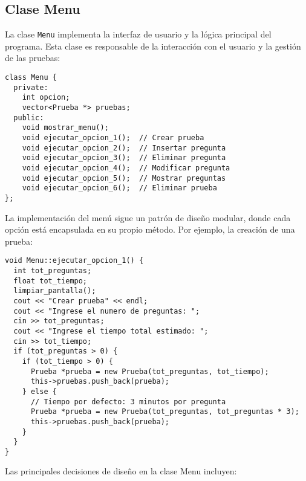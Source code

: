 \documentclass[12pt]{article}
\begin{document}
\subsection{Clase Menu}
La clase \texttt{Menu} implementa la interfaz de usuario y la l\'ogica principal del programa. Esta clase es responsable de la interacci\'on con el usuario y la gesti\'on de las pruebas:

\begin{lstlisting}[style=customc]
class Menu {
  private:
    int opcion;
    vector<Prueba *> pruebas;
  public:
    void mostrar_menu();
    void ejecutar_opcion_1();  // Crear prueba
    void ejecutar_opcion_2();  // Insertar pregunta
    void ejecutar_opcion_3();  // Eliminar pregunta
    void ejecutar_opcion_4();  // Modificar pregunta
    void ejecutar_opcion_5();  // Mostrar preguntas
    void ejecutar_opcion_6();  // Eliminar prueba
};
\end{lstlisting}

La implementaci\'on del men\'u sigue un patr\'on de dise\~no modular, donde cada opci\'on est\'a encapsulada en su propio m\'etodo. Por ejemplo, la creaci\'on de una prueba:

\begin{lstlisting}[style=customc]
void Menu::ejecutar_opcion_1() {  
  int tot_preguntas;
  float tot_tiempo;
  limpiar_pantalla();
  cout << "Crear prueba" << endl;
  cout << "Ingrese el numero de preguntas: ";
  cin >> tot_preguntas;
  cout << "Ingrese el tiempo total estimado: ";
  cin >> tot_tiempo;
  if (tot_preguntas > 0) {
    if (tot_tiempo > 0) {
      Prueba *prueba = new Prueba(tot_preguntas, tot_tiempo);
      this->pruebas.push_back(prueba);
    } else {
      // Tiempo por defecto: 3 minutos por pregunta
      Prueba *prueba = new Prueba(tot_preguntas, tot_preguntas * 3);
      this->pruebas.push_back(prueba);
    }
  }  
}
\end{lstlisting}

Las principales decisiones de dise\~no en la clase Menu incluyen:
\end{document}

